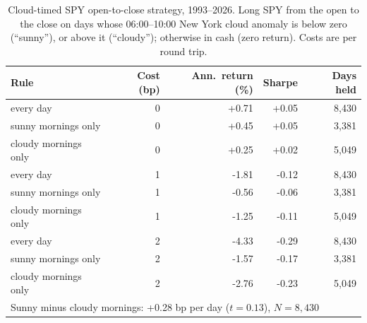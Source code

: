 \begin{table}[htbp]\centering\footnotesize
\caption{Cloud-timed SPY open-to-close strategy, 1993--2026. Long SPY from the open to the close on days whose 06:00--10:00 New York cloud anomaly is below zero (``sunny''), or above it (``cloudy''); otherwise in cash (zero return). Costs are per round trip.}
\label{tab:strategy}
\begin{tabular}{lrrrr}\toprule
Rule & Cost (bp) & Ann.\ return (\%) & Sharpe & Days held \\ \midrule
every day & 0 & +0.71 & +0.05 & 8,430 \\
sunny mornings only & 0 & +0.45 & +0.05 & 3,381 \\
cloudy mornings only & 0 & +0.25 & +0.02 & 5,049 \\
every day & 1 & -1.81 & -0.12 & 8,430 \\
sunny mornings only & 1 & -0.56 & -0.06 & 3,381 \\
cloudy mornings only & 1 & -1.25 & -0.11 & 5,049 \\
every day & 2 & -4.33 & -0.29 & 8,430 \\
sunny mornings only & 2 & -1.57 & -0.17 & 3,381 \\
cloudy mornings only & 2 & -2.76 & -0.23 & 5,049 \\
\midrule
\multicolumn{5}{l}{Sunny minus cloudy mornings: +0.28 bp per day ($t = 0.13$), $N = 8,430$} \\
\bottomrule\end{tabular}\end{table}
